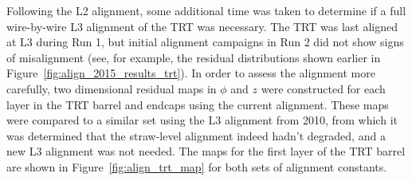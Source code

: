Following the L2 alignment, some additional time was taken to determine if a full wire-by-wire L3 alignment of the TRT was necessary.
The TRT was last aligned at L3 during Run 1, but initial alignment campaigns in Run 2 did not show signs of misalignment (see, for example, the residual distributions shown earlier in Figure~\ref{fig:align_2015_results_trt}).
In order to assess the alignment more carefully, two dimensional residual maps in $\phi$ and $z$ were constructed for each layer in the TRT barrel and endcaps using the current alignment.
These maps were compared to a similar set using the L3 alignment from 2010, from which it was determined that the straw-level alignment indeed hadn't degraded, and a new L3 alignment was not needed.
The maps for the first layer of the TRT barrel are shown in Figure~\ref{fig:align_trt_map} for both sets of alignment constants.


